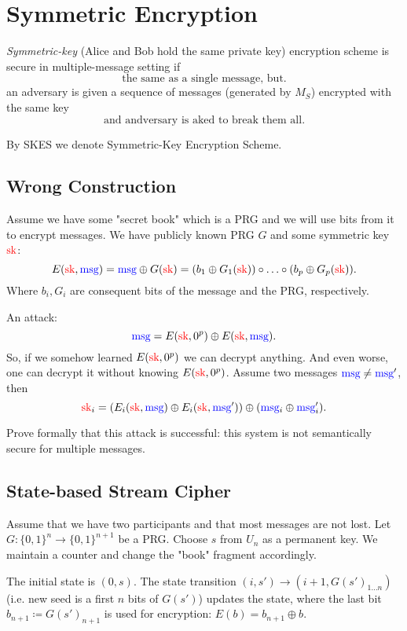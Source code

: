 

\section{Symmetric Encryption}


\begin{definition}
	\emph{Symmetric-key} (Alice and Bob hold the same private key) encryption scheme is secure in multiple-message setting if
	\[
		\text{the same as a single message, but}
	.\] an adversary is given a sequence of messages (generated by $M_S$) encrypted with the same key
	\[
		\text{and andversary is aked to break them all}
	.\] 
\end{definition}
By SKES we denote Symmetric-Key Encryption Scheme.

\subsection{Wrong Construction}

Assume we have some "secret book" which is a PRG and we will use bits from it to encrypt messages.
We have publicly known PRG $G$ and some symmetric key  $\textcolor{red}{\text{sk}}$:
 \[
E(\textcolor{red}{\text{sk}}, \textcolor{blue}{\text{msg}}) = \textcolor{blue}{\text{msg}} \oplus G(\textcolor{red}{\text{sk}}) = (b_1 \oplus G_1(\textcolor{red}{\text{sk}})) \circ \ldots \circ (b_p \oplus G_p(\textcolor{red}{\text{sk}}))
.\] 
Where $b_i, G_i$ are consequent bits of the message and the PRG, respectively.

An attack:
 \[
	 \textcolor{blue}{\text{msg}} = E(\textcolor{red}{\text{sk}}, 0^{p}) \oplus E(\textcolor{red}{\text{sk}}, \textcolor{blue}{\text{msg}})
.\] 
So, if we somehow learned $E(\textcolor{red}{\text{sk}}, 0^{p})$ we can decrypt anything.
And even worse, one can decrypt it without knowing $E(\textcolor{red}{\text{sk}}, 0^{p})$.
Assume two messages $\textcolor{blue}{\text{msg}} \neq \textcolor{blue}{\text{msg}}'$, then
\[
\textcolor{red}{\text{sk}}_i = (E_i(\textcolor{red}{\text{sk}}, \textcolor{blue}{\text{msg}}) \oplus E_i(\textcolor{red}{\text{sk}}, \textcolor{blue}{\text{msg}}')) \oplus (\textcolor{blue}{\text{msg}}_i \oplus \textcolor{blue}{\text{msg}}'_i)
.\] 
\begin{exercise}
	Prove formally that this attack is successful: this system is not semantically secure for multiple messages.
\end{exercise}

\subsection{State-based Stream Cipher}

Assume that we have two participants and that most messages are not lost.
Let $G \colon \{0, 1\}^{n} \to  \{0, 1\}^{n + 1}$ be a PRG.
Choose $s$ from $U_n$ as a permanent key.
We maintain a counter and change the "book" fragment accordingly.

The initial state is $(0, s)$.
The state transition $(i, s') \to (i + 1, G(s')_{1\ldots n})$ (i.e. new seed is a first  $n$ bits of  $G(s')$) updates the state, where the last bit $b_{n + 1} \coloneqq G(s')_{n + 1}$ is used for encryption: $E(b) = b_{n + 1} \oplus b$.

